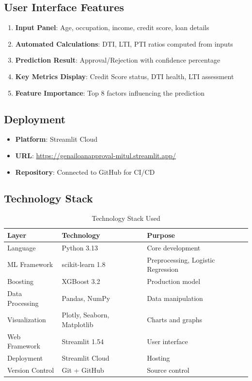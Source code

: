 \documentclass[12pt,a4paper]{article}
\begin{document}
\subsection{User Interface Features}

\begin{enumerate}
    \item \textbf{Input Panel}: Age, occupation, income, credit score, loan details
    \item \textbf{Automated Calculations}: DTI, LTI, PTI ratios computed from inputs
    \item \textbf{Prediction Result}: Approval/Rejection with confidence percentage
    \item \textbf{Key Metrics Display}: Credit Score status, DTI health, LTI assessment
    \item \textbf{Feature Importance}: Top 8 factors influencing the prediction
\end{enumerate}

\subsection{Deployment}

\begin{itemize}
    \item \textbf{Platform}: Streamlit Cloud
    \item \textbf{URL}: \url{https://genailoanapproval-mitul.streamlit.app/}
    \item \textbf{Repository}: Connected to GitHub for CI/CD
\end{itemize}

\subsection{Technology Stack}

\begin{table}[H]
\centering
\caption{Technology Stack Used}
\begin{tabular}{lll}
\toprule
\textbf{Layer} & \textbf{Technology} & \textbf{Purpose} \\
\midrule
Language & Python 3.13 & Core development \\
ML Framework & scikit-learn 1.8 & Preprocessing, Logistic Regression \\
Boosting & XGBoost 3.2 & Production model \\
Data Processing & Pandas, NumPy & Data manipulation \\
Visualization & Plotly, Seaborn, Matplotlib & Charts and graphs \\
Web Framework & Streamlit 1.54 & User interface \\
Deployment & Streamlit Cloud & Hosting \\
Version Control & Git + GitHub & Source control \\
\bottomrule
\end{tabular}
\end{table}
\end{document}
